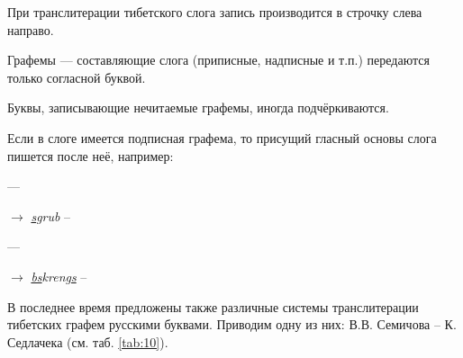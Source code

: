 При транслитерации тибетского слога запись производится в строчку слева направо.

Графемы --- составляющие слога (приписные, надписные и т.п.) передаются только согласной буквой.

Буквы, записывающие нечитаемые графемы, иногда подчёркиваются.

Если в слоге имеется подписная графема, то присущий гласный основы слога пишется после неё, например:

 ---
$\rightarrow$ \textit{\ul{s}grub} --     

 ---
$\rightarrow$ \textit{\ul{bs}kreng\ul{s}} --       

В последнее время предложены также различные системы транслитерации тибетских графем русскими буквами. Приводим одну из них: В.В. Семичова -- К. Седлачека (см. таб. \ref{tab:10}).

